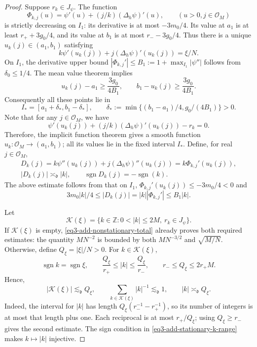 \documentclass[reqno,12pt]{amsart}
\def \Z {\mathbb Z}
\numberwithin{equation}{section}
\begin{document}
\begin{proof}
Suppose $r_k\in J_\psi$. The function
\[
 \Phi_{k,j}(u)=\psi'(u)+(j/k)(\Delta_h\psi)'(u),\qquad (u>0,j\in \mathcal O_M)
\]
is strictly decreasing on $I_1$: its derivative is at most $-3m_0/4$.
Its value at $a_1$ is at least $r_++3g_0/4$, and its value at $b_1$
is at most $r_- -3g_0/4$. Thus there is a unique
$u_k(j)\in(a_1,b_1)$ satisfying
\begin{equation}
 k\psi'(u_k(j))+j(\Delta_h\psi)'(u_k(j))=\xi/N.
 \label{eq3-add-critical-equation}
\end{equation}
On $I_1$, the derivative upper bound
$|\Phi_{k,j}'|\le B_1:=1+\max_{I_1}|\psi''|$ follows from
$\delta_0\le1/4$. The mean value theorem implies
\[
 u_k(j)-a_1\ge\frac{3g_0}{4B_1},\qquad
 b_1-u_k(j)\ge\frac{3g_0}{4B_1}.
\]
Consequently all these points lie in
\[
 I_*=[a_1+\delta_*,b_1-\delta_*],\qquad
 \delta_*:=\min\{(b_1-a_1)/4,g_0/(4B_1)\}>0.
\]
Note that for any $j\in \mathcal O_M$, we have $$\psi'(u_k(j))+(j/k)(\Delta_h\psi)'(u_k(j))-r_k=0.$$ Therefore, the implicit function theorem gives a smooth function
$u_k:\mathcal O_M\to(a_1,b_1)$; all its values lie in the fixed
interval $I_*$. Define, for real $j\in\mathcal O_M$,
\begin{equation}
 \begin{gathered}
 D_k(j)=k\psi''(u_k(j))+j(\Delta_h\psi)''(u_k(j))=k\Phi_{k,j}'(u_k(j)),\\
 |D_k(j)|\asymp_{\mathfrak d}|k|,\qquad
 \operatorname{sgn}D_k(j)=-\operatorname{sgn}(k).
 \end{gathered}
 \label{eq3-add-critical-curvature}
\end{equation}
The above estimate follows from that on $I_1$, $\Phi_{k,j}'(u_k(j))\le -3m_0/4<0$ and
$$3m_0|k|/4\le |D_k(j)|=|k||\Phi_{k,j}'|\le B_1|k|.$$ 

Let
\[
 \mathcal K(\xi)=\{k\in\Z:0<|k|\le2M,\ r_k\in J_\psi\}.
\]
If $\mathcal K(\xi)$ is empty,
\eqref{eq3-add-nonstationary-total} already proves both required
estimates: the quantity $MN^{-2}$ is bounded by both $MN^{-3/2}$
and $\sqrt{M/N}$. Otherwise, define $Q_\xi=|\xi|/N>0$. For $k\in\mathcal K(\xi)$,
\begin{equation}
 \operatorname{sgn}k=\operatorname{sgn}\xi,\qquad
 \frac{Q_\xi}{r_+}\le|k|\le\frac{Q_\xi}{r_-},\qquad
 r_-\le Q_\xi\le2r_+M.
 \label{eq3-add-stationary-k-range}
\end{equation}
Hence,
\begin{equation}
 |\mathcal K(\xi)|\lesssim_{\mathfrak d}Q_\xi,\qquad
 \sum_{k\in\mathcal K(\xi)}|k|^{-1}\lesssim_{\mathfrak d}1,
 \qquad |k|\asymp_{\mathfrak d}Q_\xi.
 \label{eq3-add-stationary-count}
\end{equation}
Indeed, the interval for $|k|$ has length
$Q_\xi(r_-^{-1}-r_+^{-1})$, so its number of integers is at most
that length plus one. Each reciprocal is at most $r_+/Q_\xi$;
using $Q_\xi\ge r_-$ gives the second estimate. The sign condition
in \eqref{eq3-add-stationary-k-range} makes $k\mapsto|k|$ injective.


\end{proof}
\end{document}
